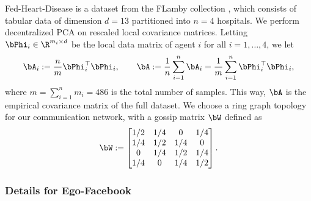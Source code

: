 \documentclass{article}
\theoremstyle{plain}
\theoremstyle{definition}
\theoremstyle{remark}
\begin{document}
Fed-Heart-Disease is a dataset from the FLamby collection \cite{flamby}, which consists of tabular data of dimension $d=13$ partitioned into $n=4$ hospitals. We perform decentralized PCA on rescaled local covariance matrices. Letting $\bPhi_i \in \R^{m_i\times d}$ be the local data matrix of agent $i$ for all $i=1,\dots,4$, we let 
\begin{align*}
  \bA_i := \frac{n}{m} \bPhi_i^\top \bPhi_i, \qquad \bA := \frac{1}{n}\sum_{i=1}^n \bA_i = \frac{1}{m} \sum_{i=1}^n \bPhi_i^\top \bPhi_i,
\end{align*}
where $m = \sum_{i=1}^n m_i = 486$ is the total number of samples. This way, $\bA$ is the empirical covariance matrix of the full dataset. We choose a ring graph topology for our communication network, with a gossip matrix $\bW$ defined as 
\begin{align*}
  \bW := \begin{bmatrix}
    1/2 & 1/4 & 0 & 1/4 \\
    1/4 & 1/2 & 1/4 & 0 \\
    0 & 1/4 & 1/2 & 1/4 \\
    1/4 & 0 & 1/4 & 1/2
  \end{bmatrix}.
\end{align*}

\subsubsection{Details for Ego-Facebook}
\end{document}
